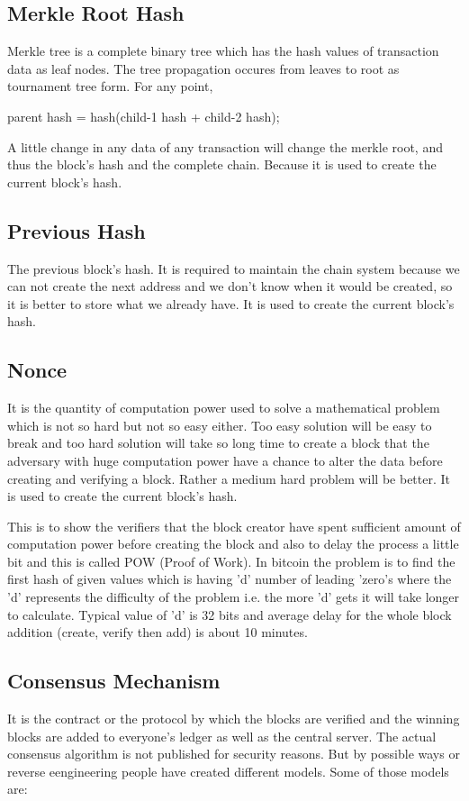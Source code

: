 \subsection{Merkle Root Hash}
Merkle tree is a complete binary tree which has the hash values of transaction data as leaf nodes. The tree propagation occures from leaves to root as tournament tree form. For any point,

			parent hash = hash(child-1 hash + child-2 hash);

A little change in any data of any transaction will change the merkle root, and thus the block's hash and the complete chain. Because it is used to create the current block's hash.

\subsection{Previous Hash}
The previous block's hash. It is required to maintain the chain system because we can not create the next address and we don't know when it would be created, so it is better to store what we already have. It is used to create the current block's hash.

\subsection{Nonce}
It is the quantity of computation power used to solve a mathematical problem which is not so hard but not so easy either. Too easy solution will be easy to break and too hard solution will take so long time to create a block that the adversary with huge computation power have a chance to alter the data before creating and verifying a block. Rather a medium hard problem will be better. It is used to create the current block's hash.

This is to show the verifiers that the block creator have spent sufficient amount of computation power before creating the block and also to delay the process a little bit and this is called POW (Proof of Work). In bitcoin the problem is to find the first hash of given values which is having 'd' number of leading 'zero's where the 'd' represents the difficulty of the problem i.e. the more 'd' gets it will take longer to calculate. Typical value of 'd' is 32 bits and average delay for the whole block addition (create, verify then add) is about 10 minutes.

\subsection{Consensus Mechanism}
It is the contract or the protocol by which the blocks are verified and the winning blocks are added to everyone's ledger as well as the central server. The actual consensus algorithm is not published for security reasons. But by possible ways or reverse eengineering people have created  different models. Some of those models are:

